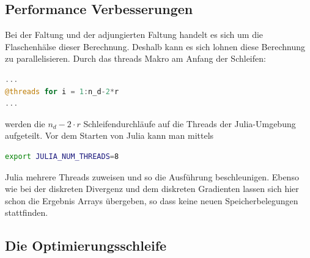 \documentclass{article}
\theoremstyle{case}
\begin{document}
\subsection*{Performance Verbesserungen}
Bei der Faltung und der adjungierten Faltung handelt es sich um die Flaschenhälse dieser Berechnung. Deshalb kann es sich lohnen diese Berechnung zu parallelisieren. Durch das threads Makro am Anfang der Schleifen:
\begin{lstlisting}[language=Julia]
...
@threads for i = 1:n_d-2*r
...
\end{lstlisting}
werden die $n_d -2\cdot r$ Schleifendurchläufe auf die Threads der Julia-Umgebung aufgeteilt. Vor dem Starten von Julia kann man mittels
\begin{lstlisting}[language=Bash]
export JULIA_NUM_THREADS=8
\end{lstlisting}
Julia mehrere Threads zuweisen und so die Ausführung beschleunigen.\newline
Ebenso wie bei der diskreten Divergenz und dem diskreten Gradienten lassen sich hier schon die Ergebnis Arrays übergeben, so dass keine neuen Speicherbelegungen stattfinden.  


\subsection{Die Optimierungsschleife}
\end{document}
